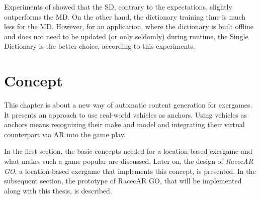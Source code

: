 Experiments of \citep{siddiqui2015robust} showed that the SD, contrary to the expectations, slightly outperforms the MD. On the other hand, the dictionary training time is much less for the MD. However, for an application, where the dictionary is built offline and does not need to be updated (or only seldomly) during runtime, the Single Dictionary is the better choice, according to this experiments.












\chapter{Concept}\label{ch:concept}
This chapter is about a new way of automatic content generation for exergames. It presents an approach to use real-world vehicles as anchors. Using vehicles as anchors means recognizing their make and model and integrating their virtual counterpart via AR into the game play.

In the first section, the basic concepts needed for a location-based exergame and what makes such a game popular are discussed. Later on, the design of \emph{RacecAR GO}, a location-based exergame that implements this concept, is presented. In the subsequent section, the prototype of RacecAR GO, that will be implemented along with this thesis, is described.

